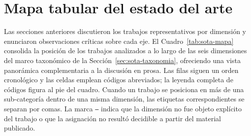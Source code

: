 \section{Mapa tabular del estado del arte}
\label{sec:sota-tabla}

Las secciones anteriores discutieron los trabajos representativos por dimensión y enunciaron observaciones críticas sobre cada eje. El Cuadro~\ref{tab:sota-mapa} consolida la posición de los trabajos analizados a lo largo de las seis dimensiones del marco taxonómico de la Sección~\ref{sec:sota-taxonomia}, ofreciendo una vista panorámica complementaria a la discusión en prosa. Las filas siguen un orden cronológico y las celdas emplean códigos abreviados; la leyenda completa de códigos figura al pie del cuadro. Cuando un trabajo se posiciona en más de una sub-categoría dentro de una misma dimensión, las etiquetas correspondientes se separan por comas. La marca \texttt{---} indica que la dimensión no fue objeto explícito del trabajo o que la asignación no resultó decidible a partir del material publicado.

